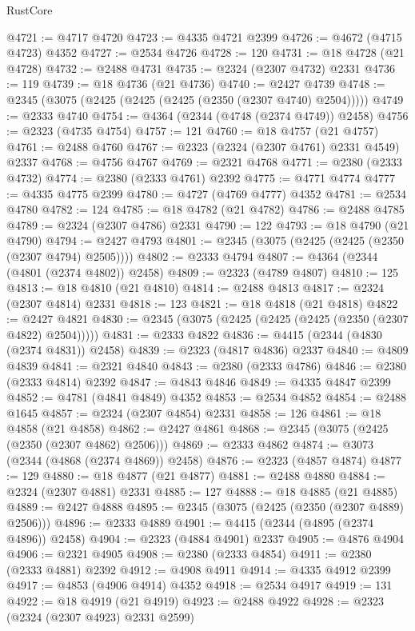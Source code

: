 \begin{lexlean}{RustCore}
\begin{coremodule}
@4721 := @4717 @4720
@4723 := @4335 @4721 @2399
@4726 := @4672 (@4715 @4723) @4352
@4727 := @2534 @4726
@4728 := 120
@4731 := @18 @4728 (@21 @4728)
@4732 := @2488 @4731
@4735 := @2324 (@2307 @4732) @2331
@4736 := 119
@4739 := @18 @4736 (@21 @4736)
@4740 := @2427 @4739
@4748 := @2345 (@3075 (@2425 (@2425 (@2425 (@2350 (@2307 @4740) @2504)))))
@4749 := @2333 @4740
@4754 := @4364 (@2344 (@4748 (@2374 @4749)) @2458)
@4756 := @2323 (@4735 @4754)
@4757 := 121
@4760 := @18 @4757 (@21 @4757)
@4761 := @2488 @4760
@4767 := @2323 (@2324 (@2307 @4761) @2331 @4549) @2337
@4768 := @4756 @4767
@4769 := @2321 @4768
@4771 := @2380 (@2333 @4732)
@4774 := @2380 (@2333 @4761) @2392
@4775 := @4771 @4774
@4777 := @4335 @4775 @2399
@4780 := @4727 (@4769 @4777) @4352
@4781 := @2534 @4780
@4782 := 124
@4785 := @18 @4782 (@21 @4782)
@4786 := @2488 @4785
@4789 := @2324 (@2307 @4786) @2331
@4790 := 122
@4793 := @18 @4790 (@21 @4790)
@4794 := @2427 @4793
@4801 := @2345 (@3075 (@2425 (@2425 (@2350 (@2307 @4794) @2505))))
@4802 := @2333 @4794
@4807 := @4364 (@2344 (@4801 (@2374 @4802)) @2458)
@4809 := @2323 (@4789 @4807)
@4810 := 125
@4813 := @18 @4810 (@21 @4810)
@4814 := @2488 @4813
@4817 := @2324 (@2307 @4814) @2331
@4818 := 123
@4821 := @18 @4818 (@21 @4818)
@4822 := @2427 @4821
@4830 := @2345 (@3075 (@2425 (@2425 (@2425 (@2350 (@2307 @4822) @2504)))))
@4831 := @2333 @4822
@4836 := @4415 (@2344 (@4830 (@2374 @4831)) @2458)
@4839 := @2323 (@4817 @4836) @2337
@4840 := @4809 @4839
@4841 := @2321 @4840
@4843 := @2380 (@2333 @4786)
@4846 := @2380 (@2333 @4814) @2392
@4847 := @4843 @4846
@4849 := @4335 @4847 @2399
@4852 := @4781 (@4841 @4849) @4352
@4853 := @2534 @4852
@4854 := @2488 @1645
@4857 := @2324 (@2307 @4854) @2331
@4858 := 126
@4861 := @18 @4858 (@21 @4858)
@4862 := @2427 @4861
@4868 := @2345 (@3075 (@2425 (@2350 (@2307 @4862) @2506)))
@4869 := @2333 @4862
@4874 := @3073 (@2344 (@4868 (@2374 @4869)) @2458)
@4876 := @2323 (@4857 @4874)
@4877 := 129
@4880 := @18 @4877 (@21 @4877)
@4881 := @2488 @4880
@4884 := @2324 (@2307 @4881) @2331
@4885 := 127
@4888 := @18 @4885 (@21 @4885)
@4889 := @2427 @4888
@4895 := @2345 (@3075 (@2425 (@2350 (@2307 @4889) @2506)))
@4896 := @2333 @4889
@4901 := @4415 (@2344 (@4895 (@2374 @4896)) @2458)
@4904 := @2323 (@4884 @4901) @2337
@4905 := @4876 @4904
@4906 := @2321 @4905
@4908 := @2380 (@2333 @4854)
@4911 := @2380 (@2333 @4881) @2392
@4912 := @4908 @4911
@4914 := @4335 @4912 @2399
@4917 := @4853 (@4906 @4914) @4352
@4918 := @2534 @4917
@4919 := 131
@4922 := @18 @4919 (@21 @4919)
@4923 := @2488 @4922
@4928 := @2323 (@2324 (@2307 @4923) @2331 @2599)

\end{coremodule}
\end{lexlean}
